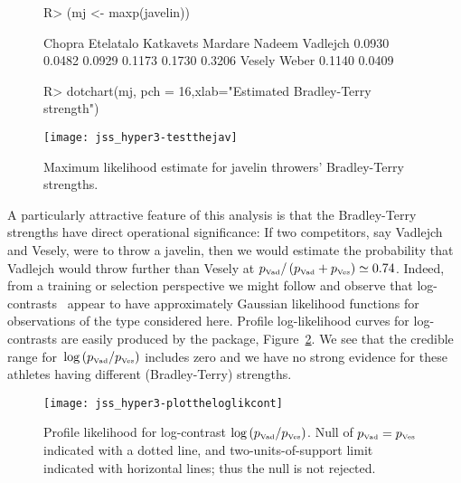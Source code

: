 \documentclass[article]{jss}
\begin{document}
 
\begin{figure}[htbp]
  \begin{center}
\begin{Schunk}
\begin{Sinput}
R> (mj <- maxp(javelin))
\end{Sinput}
\begin{Soutput}
   Chopra Etelatalo Katkavets   Mardare    Nadeem  Vadlejch 
   0.0930    0.0482    0.0929    0.1173    0.1730    0.3206 
   Vesely     Weber 
   0.1140    0.0409 
\end{Soutput}
\begin{Sinput}
R> dotchart(mj, pch = 16,xlab="Estimated Bradley-Terry strength")
\end{Sinput}
\end{Schunk}
\texttt{[image: jss\_hyper3-testthejav]}
\caption{Maximum \label{javelinbradleyterry} likelihood estimate for javelin throwers' Bradley-Terry strengths.}
\end{center}
\end{figure}


A particularly attractive feature of this analysis is that the
Bradley-Terry strengths have direct operational significance: If two
competitors, say Vadlejch and Vesely, were to throw a javelin, then we
would estimate the probability that Vadlejch would throw further than
Vesely at $\displaystyle p_{\mbox{\tiny Vad}}/\left(p_{\mbox{\tiny
Vad}} + p_{\mbox{\tiny Ves}}\right)\simeq 0.74$.  Indeed, from a
training or selection perspective we might follow \cite{hankin2017}
and observe that log-contrasts~\citep{ohagan2004} appear to have
approximately Gaussian likelihood functions for observations of the
type considered here.  Profile log-likelihood curves for log-contrasts
are easily produced by the package, Figure~\ref{profliklogcont}.  We
see that the credible range for~$\log\left(p_{\mbox{\tiny Vad}}/
p_{\mbox{\tiny Ves}}\right)$ includes zero and we have no strong
evidence for these athletes having different (Bradley-Terry)
strengths.



\begin{figure}[htbp]
\begin{center}
\texttt{[image: jss\_hyper3-plottheloglikcont]}
\caption{Profile \label{profliklogcont} likelihood for log-contrast
$\log\left(p_{\mbox{\tiny Vad}}/ p_{\mbox{\tiny Ves}}\right)$.  Null
of $p_{\mbox{\tiny Vad}}=p_{\mbox{\tiny Ves}}$ indicated with a dotted
line, and two-units-of-support limit indicated with horizontal lines;
thus the null is not rejected.}
\end{center}
\end{figure}
\end{document}
